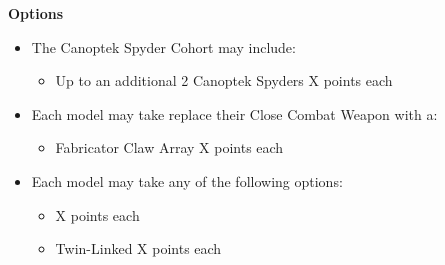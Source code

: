 \begin{minipage}[t]{0.72\textwidth}
	
	\vspace*{2em}
	\textbf{Options}
	\begin{itemize}
		\item The Canoptek Spyder Cohort may include:
		\begin{itemize}
			\item Up to an additional 2 Canoptek Spyders \dotfill X points each
		\end{itemize}
		\item Each model may take replace their Close Combat Weapon with a:
		\begin{itemize}
			\item Fabricator Claw Array \dotfill X points each
		\end{itemize}
		\item Each model may take any of the following options:
		\begin{itemize}
		\item {} \dotfill X points each
		\item Twin-Linked  \dotfill X points each
		\end{itemize}
	\end{itemize}
\end{minipage}


\newpage
